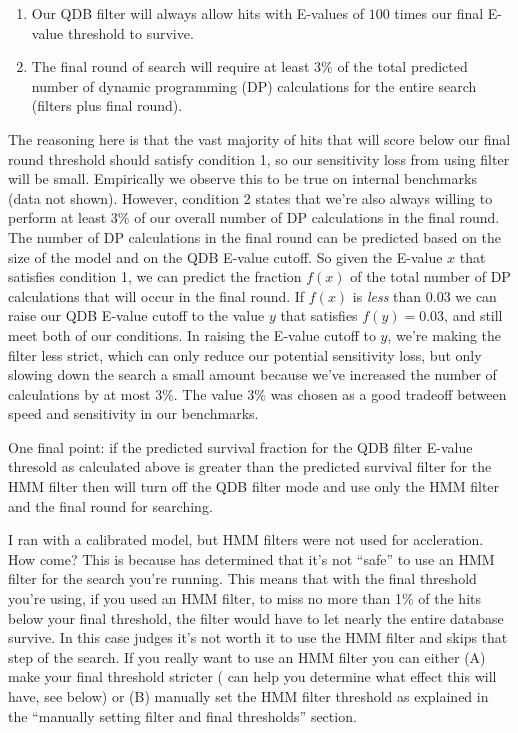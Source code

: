 \begin{enumerate}
\item
Our QDB filter will always allow hits with E-values of $100$ times our
final E-value threshold to survive. 
\item
The final round of search will require at least $3\%$ of the total
predicted number of dynamic programming (DP) calculations for the
entire search (filters plus final round).
\end{enumerate}

The reasoning here is that the vast majority of hits that will score
below our final round threshold should satisfy condition 1, so
our sensitivity loss from using filter will be small. Empirically we
observe this to be true on internal benchmarks (data not shown).
However, condition 2 states that we're also always willing to perform
at least $3\%$ of our overall number of DP calculations in the final
round. The number of DP calculations in the final round can be
predicted based on the size of the model and on the QDB E-value
cutoff. So given the E-value $x$ that satisfies condition 1, we can
predict the fraction $f(x)$ of the total number of DP calculations that will
occur in the final round. If $f(x)$ is \emph{less} than $0.03$ we can
raise our QDB E-value cutoff to the value $y$ that satisfies $f(y) = 0.03$, and
still meet both of our conditions. In raising the E-value cutoff to
$y$, we're making the filter less strict, which can only reduce our
potential sensitivity loss, but only slowing down the search a small
amount because we've increased the number of calculations by at most
$3\%$.  The value $3\%$ was chosen as a good tradeoff between speed
and sensitivity in our benchmarks. 

One final point: if the predicted survival fraction for the QDB filter
E-value thresold as calculated above is greater than the predicted
survival filter for the HMM filter then  will turn off
the QDB filter mode and use only the HMM filter and the final round
for searching.

\begin{srefaq}{I ran  with a calibrated model, but HMM
    filters were not used for accleration. How come?} This is because
     has determined that it's not ``safe'' to use
    an HMM filter for the search you're running. This means that with
    the final threshold you're using, if you used an HMM filter, 
    to miss no more than 1\% of the hits below your final threshold,
    the filter would have to let nearly the entire database
    survive. In this case  judges it's not worth it to
    use the HMM filter and skips that step of the search. If you
    really want to use an HMM filter you can either (A) make your
    final threshold stricter ( can help you determine 
    what effect this will have, see below) or (B) manually set the HMM
    filter threshold as explained in the ``manually setting filter
    and final thresholds'' section.
\end{srefaq}

